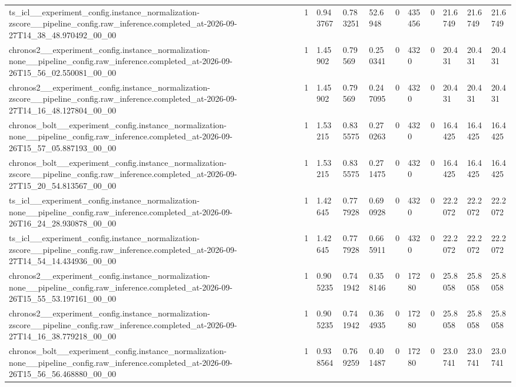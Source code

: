 \begin{tabular}{lllllllllll}
ts\_icl\_\_experiment\_config.instance\_normalization-zscore\_\_pipeline\_config.raw\_inference.completed\_at-2026-09-27T14\_38\_48.970492\_00\_00 & 1 & 0.943767 & 0.783251 & 52.6948 & 0 & 435456 & 0 & 21.6749 & 21.6749 & 21.6749 \\
chronos2\_\_experiment\_config.instance\_normalization-none\_\_pipeline\_config.raw\_inference.completed\_at-2026-09-26T15\_56\_02.550081\_00\_00 & 1 & 1.45902 & 0.79569 & 0.250341 & 0 & 4320 & 0 & 20.431 & 20.431 & 20.431 \\
chronos2\_\_experiment\_config.instance\_normalization-zscore\_\_pipeline\_config.raw\_inference.completed\_at-2026-09-27T14\_16\_48.127804\_00\_00 & 1 & 1.45902 & 0.79569 & 0.247095 & 0 & 4320 & 0 & 20.431 & 20.431 & 20.431 \\
chronos\_bolt\_\_experiment\_config.instance\_normalization-none\_\_pipeline\_config.raw\_inference.completed\_at-2026-09-26T15\_57\_05.887193\_00\_00 & 1 & 1.53215 & 0.835575 & 0.270263 & 0 & 4320 & 0 & 16.4425 & 16.4425 & 16.4425 \\
chronos\_bolt\_\_experiment\_config.instance\_normalization-zscore\_\_pipeline\_config.raw\_inference.completed\_at-2026-09-27T15\_20\_54.813567\_00\_00 & 1 & 1.53215 & 0.835575 & 0.271475 & 0 & 4320 & 0 & 16.4425 & 16.4425 & 16.4425 \\
ts\_icl\_\_experiment\_config.instance\_normalization-none\_\_pipeline\_config.raw\_inference.completed\_at-2026-09-26T16\_24\_28.930878\_00\_00 & 1 & 1.42645 & 0.777928 & 0.690928 & 0 & 4320 & 0 & 22.2072 & 22.2072 & 22.2072 \\
ts\_icl\_\_experiment\_config.instance\_normalization-zscore\_\_pipeline\_config.raw\_inference.completed\_at-2026-09-27T14\_54\_14.434936\_00\_00 & 1 & 1.42645 & 0.777928 & 0.665911 & 0 & 4320 & 0 & 22.2072 & 22.2072 & 22.2072 \\
chronos2\_\_experiment\_config.instance\_normalization-none\_\_pipeline\_config.raw\_inference.completed\_at-2026-09-26T15\_55\_53.197161\_00\_00 & 1 & 0.905235 & 0.741942 & 0.358146 & 0 & 17280 & 0 & 25.8058 & 25.8058 & 25.8058 \\
chronos2\_\_experiment\_config.instance\_normalization-zscore\_\_pipeline\_config.raw\_inference.completed\_at-2026-09-27T14\_16\_38.779218\_00\_00 & 1 & 0.905235 & 0.741942 & 0.364935 & 0 & 17280 & 0 & 25.8058 & 25.8058 & 25.8058 \\
chronos\_bolt\_\_experiment\_config.instance\_normalization-none\_\_pipeline\_config.raw\_inference.completed\_at-2026-09-26T15\_56\_56.468880\_00\_00 & 1 & 0.938564 & 0.769259 & 0.401487 & 0 & 17280 & 0 & 23.0741 & 23.0741 & 23.0741 \\

\end{tabular}
